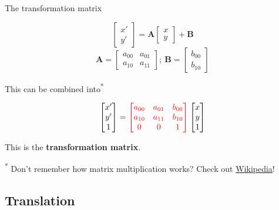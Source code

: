 \documentclass[9pt, aspectratio=169]{beamer}
\begin{document}
\begin{frame}
    {The transformation matrix}

    $$\begin{bmatrix}x'\\y'\end{bmatrix}=\mathbf{A}\begin{bmatrix}x\\y\end{bmatrix}+\mathbf{B}$$
    $$\mathbf{A}=\begin{bmatrix}a_{00}&a_{01}\\a_{10}&a_{11}\end{bmatrix};~\mathbf{B}=\begin{bmatrix}b_{00}\\b_{10}\end{bmatrix}$$
    \pause
    \begin{center}
        This can be combined into\textsuperscript{*}
    \end{center}
    $$\begin{bmatrix}x'\\y'\\1\end{bmatrix}=\color{red}\begin{bmatrix}a_{00}&a_{01}&b_{00}\\a_{10}&a_{11}&b_{10}\\0&0&1\end{bmatrix}\color{black}\begin{bmatrix}x\\y\\1\end{bmatrix}$$

    \begin{center}
        This is the \color{red}\textbf{transformation matrix}.\\
        \color{black}
    \end{center}

    \textsuperscript{*} Don't remember how matrix multiplication works? Check out \href{https://en.wikipedia.org/wiki/Matrix_multiplication}{\underline{Wikipedia}}!
\end{frame}

\subsection{Translation}
\end{document}
